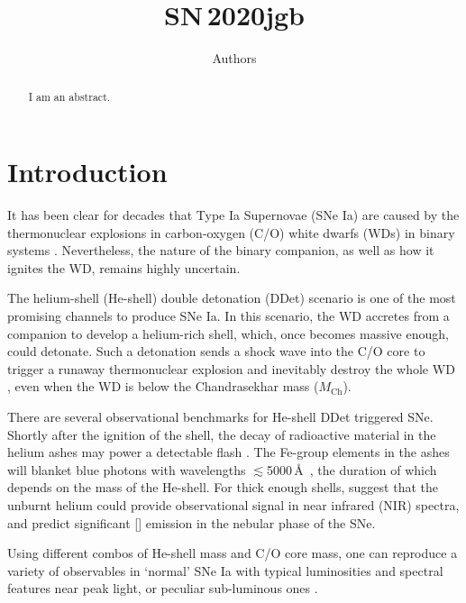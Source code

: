 \documentclass[twocolumn]{aastex631}
\newcommand{\sn}{SN\,2020jgb}
\newcommand{\Mch}{$M_\mathrm{Ch}$}
\begin{document}
\title{\sn}

\author{Authors}

\begin{abstract}
I am an abstract.
\end{abstract}


\section{Introduction} \label{sec:intro}
It has been clear for decades that Type Ia Supernovae (SNe Ia) are caused by the thermonuclear explosions in carbon-oxygen (C/O) white dwarfs (WDs) in binary systems \citep[see][for a review]{Maoz_2014}. Nevertheless, the nature of the binary companion, as well as how it ignites the WD, remains highly uncertain. 

The helium-shell (He-shell) double detonation (DDet) scenario is one of the most promising channels to produce SNe Ia. In this scenario, the WD accretes from a companion to develop a helium-rich shell, which, once becomes massive enough, could detonate. Such a detonation sends a shock wave into the C/O core to trigger a runaway thermonuclear explosion and inevitably destroy the whole WD \citep{Nomoto_1982a, Nomoto_1982b, Woosley_1986, Livne_1990, Woosley_1994, Livne_1995}, even when the WD is below the Chandrasekhar mass (\Mch).

There are several observational benchmarks for He-shell DDet triggered SNe. Shortly after the ignition of the shell, the decay of radioactive material in the helium ashes may power a detectable flash \citep{Woosley_1994,Fink_DD_2010,Kromer_DD_2010}. The Fe-group elements in the ashes will blanket blue photons with wavelengths $\lesssim$5000\,\AA\ \citep{Kromer_DD_2010}, the duration of which depends on the mass of the He-shell. For thick enough shells, \citet{Boyle2017_Helium} suggest that the unburnt helium could provide observational signal in near infrared (NIR) spectra, and \citet{polin_nebular_2021} predict significant [] emission in the nebular phase of the SNe.

Using different combos of He-shell mass and C/O core mass, one can reproduce a variety of observables in `normal' SNe Ia with typical luminosities and spectral features near peak light, or peculiar sub-luminous ones \citep{polin_observational_2019}. 
\end{document}
